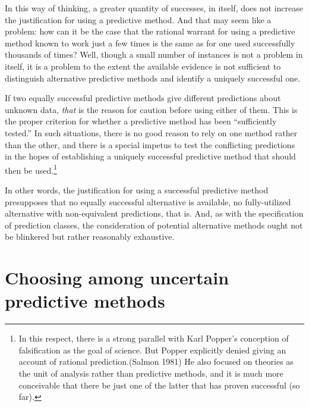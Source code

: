 \documentclass[
  letterpaper,
  DIV=11,
  numbers=noendperiod]{scrartcl}
\theoremstyle{definition}
\theoremstyle{remark}
\begin{document}
In this way of thinking, a greater quantity of successes, in itself,
does not increase the justification for using a predictive method. And
that may seem like a problem: how can it be the case that the rational
warrant for using a predictive method known to work just a few times is
the same as for one used successfully thousands of times? Well, though a
small number of instances is not a problem in itself, it is a problem to
the extent the available evidence is not sufficient to distinguish
alternative predictive methods and identify a uniquely successful one.

If two equally successful predictive methods give different predictions
about unknown data, \emph{that} is the reason for caution before using
either of them. This is the proper criterion for whether a predictive
method has been ``sufficiently tested.'' In such situations, there is no
good reason to rely on one method rather than the other, and there is a
special impetus to test the conflicting predictions in the hopes of
establishing a uniquely successful predictive method that should then be
used.\footnote{In this respect, there is a strong parallel with Karl
  Popper's conception of falsification as the goal of science. But
  Popper explicitly denied giving an account of rational
  prediction.(Salmon 1981) He also focused on theories as the unit of
  analysis rather than predictive methods, and it is much more
  conceivable that there be just one of the latter that has proven
  successful (so far).}

In other words, the justification for using a successful predictive
method presupposes that no equally successful alternative is available,
no fully-utilized alternative with non-equivalent predictions, that is.
And, as with the specification of prediction classes, the consideration
of potential alternative methods ought not be blinkered but rather
reasonably exhaustive.

\section{Choosing among uncertain predictive methods}\label{sec-prob}
\end{document}
